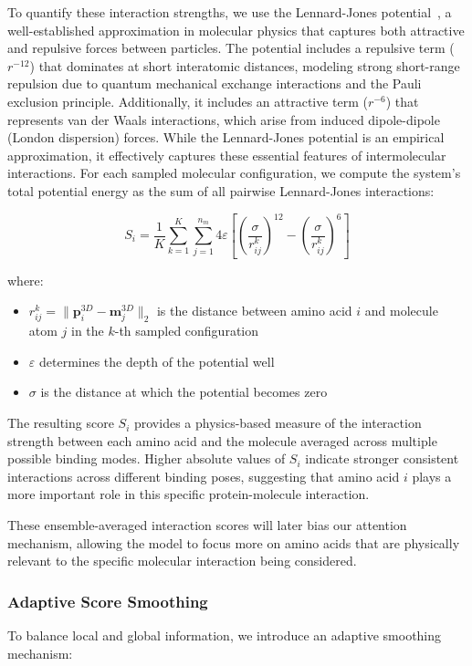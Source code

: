 \documentclass[sigconf]{acmart}
\begin{document}
To quantify these interaction strengths, we use the Lennard-Jones potential~\cite{tee1966molecular,wang2020lennard}, a well-established approximation in molecular physics that captures both attractive and repulsive forces between particles. The potential includes a repulsive term ($r^{-12}$) that dominates at short interatomic distances, modeling strong short-range repulsion due to quantum mechanical exchange interactions and the Pauli exclusion principle. Additionally, it includes an attractive term ($r^{-6}$) that represents van der Waals interactions, which arise from induced dipole-dipole (London dispersion) forces. While the Lennard-Jones potential is an empirical approximation, it effectively captures these essential features of intermolecular interactions. For each sampled molecular configuration, we compute the system's total potential energy as the sum of all pairwise Lennard-Jones interactions:



\begin{equation}
    S_i = \frac{1}{K}\sum_{k=1}^K \sum_{j=1}^{n_m} 4\varepsilon \left[\left(\frac{\sigma}{r_{ij}^k}\right)^{12} - \left(\frac{\sigma}{r_{ij}^k}\right)^{6}\right]
\end{equation}

where:
\begin{itemize}
    \item $r_{ij}^k = \|\mathbf{p}_i^{3D} - \mathbf{m}_j^{3D}\|_2$ is the distance between amino acid $i$ and molecule atom $j$ in the $k$-th sampled configuration
    \item $\varepsilon$ determines the depth of the potential well 
    \item $\sigma$ is the distance at which the potential becomes zero
\end{itemize}

The resulting score $S_i$ provides a physics-based measure of the interaction strength between each amino acid and the molecule averaged across multiple possible binding modes. Higher absolute values of $S_i$ indicate stronger consistent interactions across different binding poses, suggesting that amino acid $i$ plays a more important role in this specific protein-molecule interaction.

These ensemble-averaged interaction scores will later bias our attention mechanism, allowing the model to focus more on amino acids that are physically relevant to the specific molecular interaction being considered. 


\subsubsection{Adaptive Score Smoothing}
\label{sec:mol_smooth}
To balance local and global information, we introduce an adaptive smoothing mechanism:
\end{document}

